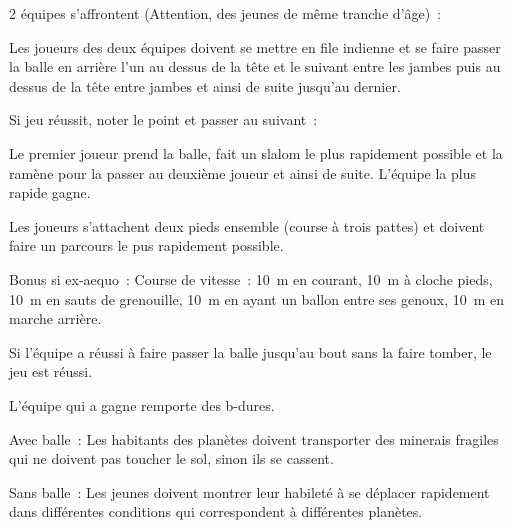 \documentclass{grand-jeu}
\begin{document}
\begin{regles}
2 équipes s’affrontent (Attention, des jeunes de même tranche d'âge) :

Les joueurs des deux équipes doivent se mettre en file indienne et se faire passer la balle en arrière l’un au dessus de la tête et le suivant entre les jambes puis au dessus de la tête entre jambes et ainsi de suite jusqu’au dernier.

\vspace{0.2cm}

Si jeu réussit, noter le point et passer au suivant :

Le premier joueur prend la balle, fait un slalom le plus rapidement possible et la ramène pour la passer au deuxième joueur et ainsi de suite. L’équipe la plus rapide gagne.

Les joueurs s’attachent deux pieds ensemble (course à trois pattes) et doivent faire un parcours le pus rapidement possible.

\vspace{0.2cm}

Bonus si ex-aequo : Course de vitesse : 10 m en courant, 10 m à cloche pieds, 10 m en sauts de grenouille, 10 m en ayant un ballon entre ses genoux, 10 m en marche arrière.

Si l’équipe a réussi à faire passer la balle jusqu’au bout sans la faire tomber, le jeu est réussi.

L’équipe qui a gagne remporte des b-dures.
\end{regles}

\begin{imaginaire}
Avec balle : Les habitants des planètes doivent transporter des minerais fragiles qui ne doivent pas toucher le sol, sinon ils se cassent.

Sans balle : Les jeunes doivent montrer leur habileté à se déplacer rapidement dans différentes conditions qui correspondent à différentes planètes.
\end{imaginaire}

\begin{moments-stop}
\end{moments-stop}
\end{document}
